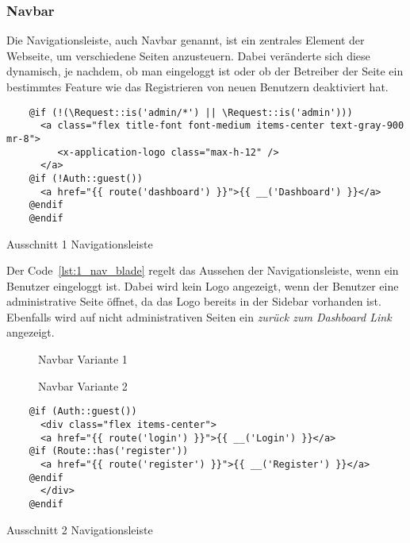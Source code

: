 \subsubsection{Navbar}
Die Navigationsleiste, auch Navbar genannt, ist ein zentrales Element der Webseite,
um verschiedene Seiten anzusteuern. Dabei veränderte sich diese dynamisch, je
nachdem, ob man eingeloggt ist oder ob der Betreiber der Seite ein bestimmtes Feature wie das
Registrieren von neuen Benutzern deaktiviert hat.

\begin{listing}[H]
  \begin{verbatim}
    @if (!(\Request::is('admin/*') || \Request::is('admin')))
      <a class="flex title-font font-medium items-center text-gray-900 mr-8">
         <x-application-logo class="max-h-12" />
      </a>
    @if (!Auth::guest())
      <a href="{{ route('dashboard') }}">{{ __('Dashboard') }}</a>
    @endif
    @endif
  \end{verbatim}
  \caption{Ausschnitt 1 Navigationsleiste}
  \label{lst:1_nav_blade}
\end{listing}

Der Code~\ref{lst:1_nav_blade} regelt das Aussehen der Navigationsleiste, wenn ein Benutzer
eingeloggt ist. Dabei wird kein Logo angezeigt, wenn der Benutzer eine
administrative Seite öffnet, da das Logo bereits in der
Sidebar vorhanden ist. Ebenfalls wird auf nicht administrativen Seiten ein
\textit{zurück zum Dashboard Link} angezeigt.

\begin{figure}[H]
  \centering
  \caption{Navbar Variante 1}
\end{figure}

\begin{figure}[H]
  \centering
  \caption{Navbar Variante 2}
\end{figure}

\begin{listing}[H]
  \begin{verbatim}
    @if (Auth::guest())
      <div class="flex items-center">
      <a href="{{ route('login') }}">{{ __('Login') }}</a>
    @if (Route::has('register'))
      <a href="{{ route('register') }}">{{ __('Register') }}</a>
    @endif
      </div>
    @endif
  \end{verbatim}
  \caption{Ausschnitt 2 Navigationsleiste}
\end{listing}

